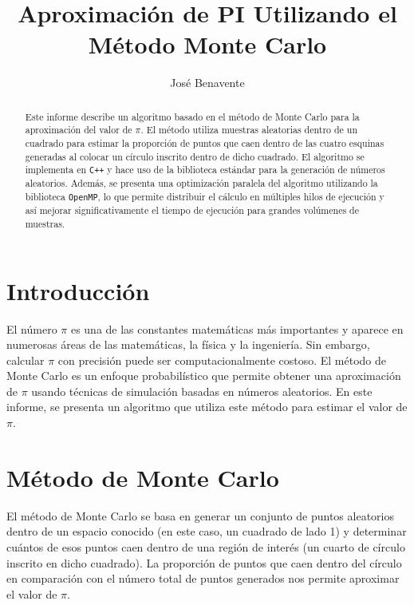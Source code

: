 \documentclass[a4paper, 10pt, onecolumn]{IEEEtran}
\begin{document}
  
  \title{Aproximación de PI Utilizando el Método Monte Carlo}
  \author{José Benavente}
  \maketitle
  
  \newpage
  
  \tableofcontents
  
  \listoftables
  
  \listoffigures
  
  \lstlistoflistings
  
  \newpage


\begin{abstract}
Este informe describe un algoritmo basado en el método de Monte Carlo para la aproximación del valor de $\pi$. El método utiliza muestras aleatorias dentro de un cuadrado para estimar la proporción de puntos que caen dentro de las cuatro esquinas generadas al colocar un círculo inscrito dentro de dicho cuadrado. El algoritmo se implementa en \texttt{C++} y hace uso de la biblioteca estándar para la generación de números aleatorios. Además, se presenta una optimización paralela del algoritmo utilizando la biblioteca \texttt{OpenMP}, lo que permite distribuir el cálculo en múltiples hilos de ejecución y así mejorar significativamente el tiempo de ejecución para grandes volúmenes de muestras.
\end{abstract}

\section{Introducción}
El número $\pi$ es una de las constantes matemáticas más importantes y aparece en numerosas áreas de las matemáticas, la física y la ingeniería. Sin embargo, calcular $\pi$ con precisión puede ser computacionalmente costoso. El método de Monte Carlo es un enfoque probabilístico que permite obtener una aproximación de $\pi$ usando técnicas de simulación basadas en números aleatorios. En este informe, se presenta un algoritmo que utiliza este método para estimar el valor de $\pi$.

\section{Método de Monte Carlo}
El método de Monte Carlo se basa en generar un conjunto de puntos aleatorios dentro de un espacio conocido (en este caso, un cuadrado de lado 1) y determinar cuántos de esos puntos caen dentro de una región de interés (un cuarto de círculo inscrito en dicho cuadrado). La proporción de puntos que caen dentro del círculo en comparación con el número total de puntos generados nos permite aproximar el valor de $\pi$.
\end{document}

